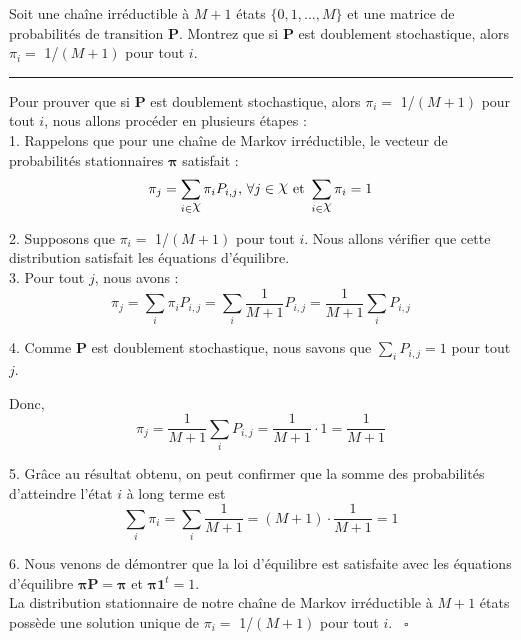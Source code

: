\documentclass{article}
\begin{document}
    \vspace{-.15cm}
    \noindent Soit une chaîne irréductible à \(M + 1\) états \(\{0,1,...,M\}\) et une matrice de probabilités de transition $\boldsymbol{P}$. Montrez que si $\boldsymbol{P}$ est doublement stochastique, alors \(\pi_i =\) 1/$(M + 1)$ pour tout $i$.

    \vspace{.5cm}
    \hrule
    \vspace{.5cm}

    \noindent Pour prouver que si $\boldsymbol{P}$ est doublement stochastique, alors \(\pi_i =\) 1/$(M + 1)$ pour tout $i$, nous allons procéder en plusieurs étapes : \\

    1. Rappelons que pour une chaîne de Markov irréductible, le vecteur de probabilités stationnaires $\boldsymbol{\pi}$ satisfait :
    \[
        \pi_j = \sum_{i\in\raisebox{0.4ex}{\normalsize $\chi$}} \pi_i P_{i,j},\, \forall j\in\raisebox{0.4ex}{\large $\chi$}\ \text{et}\ \sum_{i\in\raisebox{0.4ex}{\normalsize $\chi$}} \pi_i = 1
    \]
    
    2. Supposons que \(\pi_i =\) 1/$(M + 1)$ pour tout $i$. Nous allons vérifier que cette distribution satisfait les équations d'équilibre. \\

    3. Pour tout $j$, nous avons :
    \[
       \pi_j = \sum_i \pi_i P_{i,j} = \sum_i \frac{1}{M + 1} P_{i,j} = \frac{1}{M + 1} \sum_i P_{i,j}
    \]

    4. Comme $\boldsymbol{P}$ est doublement stochastique, nous savons que \(\sum_i P_{i,j} = 1\) pour tout $j$.

    \vspace{.2cm}
    Donc,
    \[
        \pi_j = \frac{1}{M + 1} \sum_i P_{i,j} = \frac{1}{M + 1} \cdot 1 = \frac{1}{M + 1}
    \]

    5. Grâce au résultat obtenu, on peut confirmer que la somme des probabilités d'atteindre l'état $i$ à long terme est
    \[
        \sum_i \pi_i = \sum_i \frac{1}{M + 1} = (M + 1) \cdot \frac{1}{M + 1} = 1
    \]

    6. Nous venons de démontrer que la loi d'équilibre est satisfaite avec les équations d'équilibre \(\boldsymbol{\pi}\boldsymbol{P} = \boldsymbol{\pi}\) et \(\boldsymbol{\pi}\boldsymbol{1}^t = 1\). \\

    \noindent La distribution stationnaire de notre chaîne de Markov irréductible à $M + 1$ états possède une solution unique de \(\pi_i =\) 1/$(M + 1)$ pour tout $i$. \ $\square$
\end{document}
